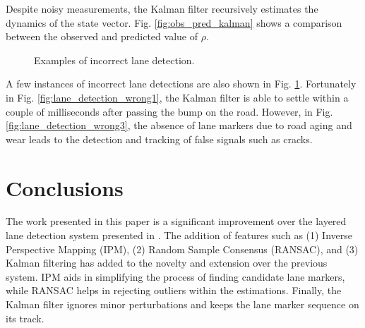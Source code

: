 \documentclass{article}
\begin{document}
Despite noisy measurements, the Kalman filter recursively estimates the dynamics of the state vector. Fig. \ref{fig:obs_pred_kalman} shows a comparison between the observed and predicted value of $\rho$.
\begin{figure}[htb!]
  \centering
  \hspace{0.00001in}
  \caption{Examples of incorrect lane detection.}
  \label{fig:lane_detection_wrong}
\end{figure}

A few instances of incorrect lane detections are also shown in Fig. \ref{fig:lane_detection_wrong}. Fortunately in Fig. \ref{fig:lane_detection_wrong1}, the Kalman filter is able to settle within a couple of milliseconds after passing the bump on the road. However, in Fig. \ref{fig:lane_detection_wrong3}, the absence of lane markers due to road aging and wear leads to the detection and tracking of false signals such as cracks.
\section{Conclusions}
\label{sec:concl}
The work presented in this paper is a significant improvement over the layered lane detection system presented in \cite{borkar_layered_2009}. The addition of features such as (1) Inverse Perspective Mapping (IPM), (2) Random Sample Consensus (RANSAC), and (3) Kalman filtering has added to the novelty and extension over the previous system. IPM aids in simplifying the process of finding candidate lane markers, while RANSAC helps in rejecting outliers within the estimations. Finally, the Kalman filter ignores minor perturbations and keeps the lane marker sequence on its track.
\end{document}
